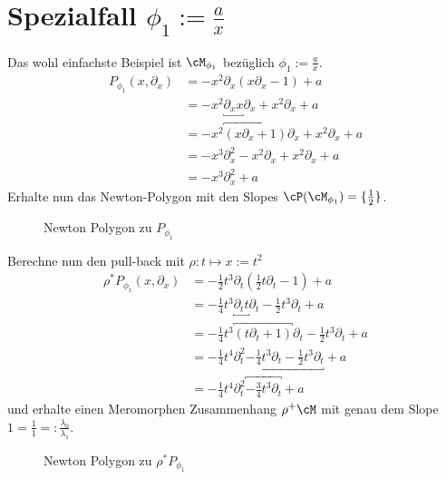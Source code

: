 \section{Spezialfall $\phi_1:=\frac{a}{x}$}
Das wohl einfachste Beispiel ist $\cM_{\phi_1}$ bezüglich
$\phi_1:=\frac{a}{x}$.
\begin{align*}
P_{\phi_1}(x,\partial_x) &=-x^2\partial_x (x\partial_x-1)+a \\
  &=-x^2\underbracket{\partial_xx}\partial_x+x^2\partial_x+a \\
  &=-x^2\overbracket{(x\partial_x+1)}\partial_x+x^2\partial_x+a \\
  &=-x^3\partial_x^2 - x^2\partial_x+x^2\partial_x+a \\
  &=-x^3\partial_x^2+a
\end{align*}
Erhalte nun das Newton-Polygon mit den Slopes
$\cP(\cM_{\phi_1})=\{\frac{1}{2}\}$.
\begin{figure}[H]
\caption{Newton Polygon zu $P_{\phi_1}$}
\begin{center}
\end{center}
\end{figure}
Berechne nun den pull-back mit $\rho:t\mapsto x:=t^2$
\begin{align*}
\rho^*P_{\phi_1}(x,\partial_x)
  &=-\frac{1}{2}t^{3}\partial_t
    (\frac{1}{2}t\partial_t-1)+a\\
  &=-\frac{1}{4}t^{3}\underbracket{\partial_tt}\partial_t
    -\frac{1}{2}t^{3}\partial_t+a\\
  &=-\frac{1}{4}t^{3}\overbracket{(t\partial_t+1)}\partial_t
    -\frac{1}{2}t^{3}\partial_t+a\\
  &=-\frac{1}{4}t^{4}\partial_t^2
    \underbracket{-\frac{1}{4}t^{3}\partial_t-\frac{1}{2}t^{3}\partial_t}+a\\
  &=-\frac{1}{4}t^{4}\partial_t^2
    \overbracket{-\frac{3}{4}t^{3}\partial_t}+a
\end{align*}
und erhalte einen Meromorphen Zusammenhang $\rho^+\cM$ mit genau dem Slope
$1=\frac{1}{1}=:\frac{\lambda_0}{\lambda_1}$.
\begin{figure}[H]
\caption{Newton Polygon zu $\rho^*P_{\phi_1}$}
\begin{center}
\end{center}
\end{figure}
